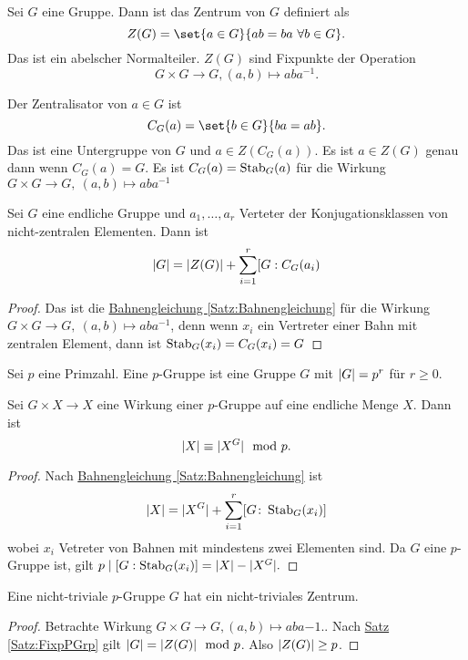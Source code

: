 \begin{Def}
    Sei $G$ eine Gruppe. Dann ist das Zentrum von $G$ definiert als
    $$Z(G)=\set{a\in G}{ab=ba\ \forall b\in G}.$$ Das ist ein abelscher Normalteiler. $Z(G)$ sind Fixpunkte der Operation $$G\times G\to G, (a,b)\mapsto aba^{-1}.$$
\end{Def}
\begin{Def}
    Der Zentralisator von $a\in G$ ist $$C_G(a)=\set{b\in G}{ba=ab}.$$ Das ist eine Untergruppe von $G$ und $a\in Z(C_G(a))$. Es ist $a\in Z(G)$ genau dann wenn $C_G(a)=G$. Es ist $C_G(a)=\operatorname{Stab}_G(a)$ für die Wirkung $G\times G\to G,\ (a,b)\mapsto aba^{-1}$
\end{Def}
\begin{Satz}[Klassengleichung]\label{Satz:Klassengleichung}
    Sei $G$ eine endliche Gruppe und $a_1,\dots,a_r$ Verteter der Konjugationsklassen von nicht-zentralen Elementen. Dann ist 
    $$\lvert G\rvert=\lvert Z(G)\rvert+\sum_{i=1}^r[G:C_G(a_i)$$
\end{Satz}
\begin{proof}
    Das ist die \hyperref[Satz:Bahnengleichung]{Bahnengleichung \ref{Satz:Bahnengleichung}} für die Wirkung $G\times G\to G,\ (a,b)\mapsto aba^{-1}$, denn wenn $x_i$ ein Vertreter einer Bahn mit zentralen Element, dann ist $\operatorname{Stab}_G(x_i)=C_G(x_i)=G$
\end{proof}
\begin{Def}
    Sei $p$ eine Primzahl. Eine $p$-Gruppe ist eine Gruppe $G$ mit $\lvert G\rvert=p^r$ für $r\geq 0$. 
\end{Def}
\begin{Satz}\label{Satz:FixpPGrp}
    Sei $G\times X\to X$ eine Wirkung einer $p$-Gruppe auf eine endliche Menge $X$. Dann ist 
    $$\lvert X\rvert\equiv \lvert X^G\rvert\mod p.$$
\end{Satz}
\begin{proof}
    Nach \hyperref[Satz:Bahnengleichung]{Bahnengleichung \ref{Satz:Bahnengleichung}} ist 
    $$\lvert X\rvert=\lvert X^G\rvert+\sum_{i=1}^r[G\colon \operatorname{Stab}_G(x_i)]$$ wobei $x_i$ Vetreter von Bahnen mit mindestens zwei Elementen sind. Da $G$ eine $p$-Gruppe ist, gilt 
    $p\mid [G:\operatorname{Stab}_G(x_i)]=\lvert X\rvert-\lvert X^G\rvert.$
\end{proof}
\begin{Satz}\label{Satz:pGrpZentrum}
    Eine nicht-triviale $p$-Gruppe $G$ hat ein nicht-triviales Zentrum.
\end{Satz}
\begin{proof}
    Betrachte Wirkung $G\times G\to G, (a,b)\mapsto aba{-1}.$. Nach \hyperref[Satz:FixpPGrp]{ Satz \ref{Satz:FixpPGrp}} gilt $\lvert G\rvert=\lvert Z(G)\rvert\mod p$. Also $\lvert Z(G)\rvert\geq p$.
\end{proof}

